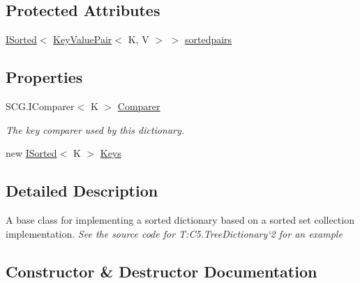 \subsection*{Protected Attributes}
\begin{DoxyCompactItemize}
\item 
\hyperlink{interface_c5_1_1_i_sorted}{I\+Sorted}$<$ \hyperlink{struct_c5_1_1_key_value_pair}{Key\+Value\+Pair}$<$ K, V $>$ $>$ \hyperlink{class_c5_1_1_sorted_dictionary_base_ac8cd7ef2783fe7109e21d0f7456b2d47}{sortedpairs}
\end{DoxyCompactItemize}
\subsection*{Properties}
\begin{DoxyCompactItemize}
\item 
S\+C\+G.\+I\+Comparer$<$ K $>$ \hyperlink{class_c5_1_1_sorted_dictionary_base_a0fedf269f1b51cf8b0ed3a46227936ac}{Comparer}
\begin{DoxyCompactList}\small\item\em The key comparer used by this dictionary. \end{DoxyCompactList}\item 
new \hyperlink{interface_c5_1_1_i_sorted}{I\+Sorted}$<$ K $>$ \hyperlink{class_c5_1_1_sorted_dictionary_base_ab1fc4a8d9ff1f315eafca20b17f6ca1d}{Keys}
\end{DoxyCompactItemize}


\subsection{Detailed Description}
A base class for implementing a sorted dictionary based on a sorted set collection implementation. {\itshape See the source code for T\+:\+C5.\+Tree\+Dictionary`2 for an example} 



\subsection{Constructor \& Destructor Documentation}
\hypertarget{class_c5_1_1_sorted_dictionary_base_a097fe60688de7c61e8d70c8cbde83e60}{}
